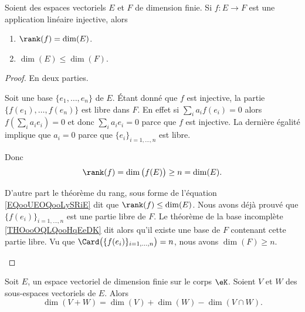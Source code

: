 \begin{lemma}	\label{LEMooOMZUooDvwbhf}
	Soient des espaces vectoriels \( E\) et \( F\) de dimension finie. Si \(f \colon E\to F  \) est une application linéaire injective, alors
	\begin{enumerate}
		\item		\label{ITEMooSTNLooGfZYMp}
		      \( \rank(f)=\dim(E)\).
		\item		\label{ITEMooTAONooSUTnHq}
		      \( \dim(E)\leq \dim(F)\).
	\end{enumerate}
\end{lemma}

\begin{proof}
	En deux parties.
	\begin{subproof}
		Soit une base \( \{ e_1,\ldots,e_n \}\)	de \( E\). Étant donné que \( f\) est injective, la partie \( \{ f(e_1),\ldots,f(e_n) \}\) est libre dans \( F\). En effet si \( \sum_i a_if(e_i)=0\) alors \( f(\sum_ia_ie_i)=0\) et donc \( \sum_ia_ie_i=0\) parce que \( f\) est injective. La dernière égalité implique que \( a_i=0\) parce que \( \{ e_i \}_{i=1,\ldots,n}\) est libre.

		Donc
		\begin{equation}
			\rank(f)=\dim\big( f(E) \big)\geq n=\dim(E).
		\end{equation}

		D'autre part le théorème du rang, sous forme de l'équation \ref{EQooUEOQooLySRiE} dit que \( \rank(f)\leq \dim(E)\).
		Nous avons déjà prouvé que \( \{ f(e_i) \}_{i=1,\ldots,n}\) est une partie libre de \( F\). Le théorème de la base incomplète \ref{THOooOQLQooHqEeDK} dit alors qu'il existe une base de \( F\) contenant cette partie libre. Vu que \( \Card\big( \{ f(e_i) \}_{i=1,\ldots,n} \big)=n\), nous avons \( \dim(F)\geq n\).
	\end{subproof}
\end{proof}


\begin{proposition}      \label{PROPooQCIXooHIyPPq}
	Soit \( E\), un espace vectoriel de dimension finie sur le corps \( \eK\). Soient \( V\) et \( W\) des sous-espaces vectoriels de \( E\). Alors
	\begin{equation}
		\dim(V+W)=\dim(V)+\dim(W)-\dim(V\cap W).
	\end{equation}
\end{proposition}

